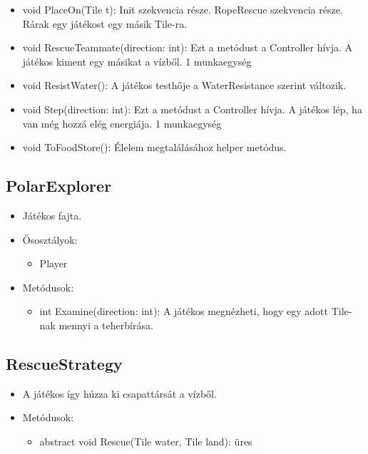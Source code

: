 \begin{itemize}
\begin{itemize}
		\item void PlaceOn(Tile t): Init szekvencia része. RopeRescue szekvencia része. Rárak egy játékost egy másik Tile-ra.
		\item void RescueTeammate(direction: int): Ezt a metódust a Controller hívja. A játékos kiment egy másikat a vízből. 1 munkaegység
		\item void ResistWater(): A játékos testhője a WaterResistance szerint változik.
		\item void Step(direction: int): Ezt a metódust a Controller hívja. A játékos lép, ha van még hozzá elég energiája. 1 munkaegység
		\item void ToFoodStore(): Élelem megtalálásához helper metódus.
	\end{itemize}
\end{itemize}

\subsection{PolarExplorer}
\begin{itemize}
	\item Játékos fajta.
	\item Ősosztályok:
	\begin{itemize}
		\item Player
	\end{itemize}
	\item Metódusok:
	\begin{itemize}
		\item int Examine(direction: int): A játékos megnézheti, hogy egy adott Tile-nak mennyi a teherbírása.
	\end{itemize}
\end{itemize}

\subsection{RescueStrategy}
\begin{itemize}
		\item A játékos így húzza ki csapattársát a vízből.
	\item Metódusok:
	\begin{itemize}
		\item abstract void Rescue(Tile water, Tile land): üres
	\end{itemize}
\end{itemize}

